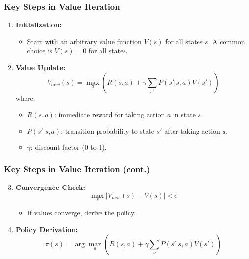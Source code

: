 \documentclass[aspectratio=169]{beamer}
\begin{document}
\begin{frame}[fragile]
    \frametitle{Key Steps in Value Iteration}
    \begin{enumerate}
        \item \textbf{Initialization:}
            \begin{itemize}
                \item Start with an arbitrary value function \( V(s) \) for all states \( s \). A common choice is \( V(s) = 0 \) for all states.
            \end{itemize}
        
        \item \textbf{Value Update:}
            \begin{equation}
                V_{new}(s) = \max_{a} \left( R(s, a) + \gamma \sum_{s'} P(s'|s, a) V(s') \right)
            \end{equation}
            where:
            \begin{itemize}
                \item \( R(s, a) \): immediate reward for taking action \( a \) in state \( s \).
                \item \( P(s'|s, a) \): transition probability to state \( s' \) after taking action \( a \).
                \item \( \gamma \): discount factor (0 to 1).
            \end{itemize}
    \end{enumerate}
\end{frame}

\begin{frame}[fragile]
    \frametitle{Key Steps in Value Iteration (cont.)}
    \begin{enumerate}
        \setcounter{enumi}{2}
        \item \textbf{Convergence Check:}
            \begin{equation}
                \max_{s} |V_{new}(s) - V(s)| < \epsilon
            \end{equation}
            \begin{itemize}
                \item If values converge, derive the policy.
            \end{itemize}

        \item \textbf{Policy Derivation:}
            \begin{equation}
                \pi(s) = \arg\max_{a} \left( R(s, a) + \gamma \sum_{s'} P(s'|s, a) V(s') \right)
            \end{equation}
    \end{enumerate}
\end{frame}
\end{document}
